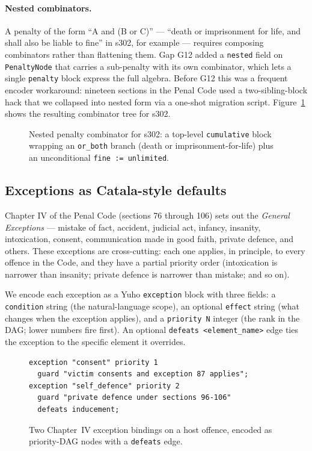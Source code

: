 \paragraph{Nested combinators.} A penalty of the form ``A and (B or C)''
--- ``death or imprisonment for life, and shall also be liable to fine''
in s302, for example --- requires composing combinators rather than
flattening them. Gap \textsf{G12} added a \texttt{nested} field on
\texttt{PenaltyNode} that carries a sub-penalty with its own combinator,
which lets a single \texttt{penalty} block express the full algebra.
Before \textsf{G12} this was a frequent encoder workaround: nineteen
sections in the Penal Code used a two-sibling-block hack that we
collapsed into nested form via a one-shot migration script.
Figure~\ref{fig:penalty} shows the resulting combinator tree for s302.

\begin{figure}[!htbp]
\centering
\resizebox{0.85\textwidth}{!}{}
\caption{Nested penalty combinator for s302: a top-level
\texttt{cumulative} block wrapping an \texttt{or\_both} branch
(death or imprisonment-for-life) plus an unconditional
\texttt{fine := unlimited}.}
\label{fig:penalty}
\end{figure}

\subsection{Exceptions as Catala-style defaults}
\label{subsec:exceptions}
Chapter IV of the Penal Code (sections 76 through 106) sets out the
\emph{General Exceptions} --- mistake of fact, accident, judicial act,
infancy, insanity, intoxication, consent, communication made in good
faith, private defence, and others. These exceptions are cross-cutting:
each one applies, in principle, to every offence in the Code, and they
have a partial priority order (intoxication is narrower than insanity;
private defence is narrower than mistake; and so on).

We encode each exception as a Yuho \texttt{exception} block with three
fields: a \texttt{condition} string (the natural-language scope), an
optional \texttt{effect} string (what changes when the exception applies),
and a \texttt{priority N} integer (the rank in the DAG; lower numbers
fire first). An optional \texttt{defeats <element\_name>} edge ties the
exception to the specific element it overrides.

\begin{figure}[!htbp]
\begin{lstlisting}[language=yuho,basicstyle=\ttfamily\scriptsize]
exception "consent" priority 1
  guard "victim consents and exception 87 applies";
exception "self_defence" priority 2
  guard "private defence under sections 96-106"
  defeats inducement;
\end{lstlisting}
\caption{Two Chapter~IV exception bindings on a host offence,
encoded as priority-DAG nodes with a \texttt{defeats} edge.}
\label{fig:exception-listing}
\end{figure}

